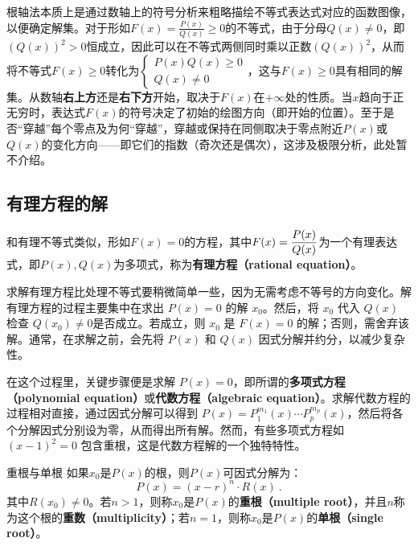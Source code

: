 根轴法本质上是通过数轴上的符号分析来粗略描绘不等式表达式对应的函数图像，以便确定解集。对于形如$\displaystyle F(x) = \frac{P(x)}{Q(x)} \geq 0$的不等式，由于分母$Q(x) \neq 0$，即$\left(Q(x)\right)^2 > 0$恒成立，因此可以在不等式两侧同时乘以正数$\left(Q(x)\right)^2$，从而将不等式$\displaystyle F(x) \geq 0$转化为$\displaystyle\begin{cases}P(x)Q(x) \geq 0 \\ Q(x) \neq 0\end{cases}$，这与$F(x) \geq 0$具有相同的解集。从数轴\textbf{右上方}还是\textbf{右下方}开始，取决于$F(x)$在$+\infty$处的性质。当$x$趋向于正无穷时，表达式$F(x)$的符号决定了初始的绘图方向（即开始的位置）。至于是否“穿越”每个零点及为何“穿越”，穿越或保持在同侧取决于零点附近$P(x)$或$Q(x)$的变化方向——即它们的指数（奇次还是偶次），这涉及极限分析，此处暂不介绍。

\subsection{有理方程的解}\label{sub_SolEqI_1}

和有理不等式类似，形如$F(x)=0$的方程，其中$\displaystyle F(x)={P(x)\over Q(x)}$为一个有理表达式，即$P(x),Q(x)$为多项式，称为\textbf{有理方程（rational equation）}。

求解有理方程比处理不等式要稍微简单一些，因为无需考虑不等号的方向变化。解有理方程的过程主要集中在求出 $P(x) = 0$ 的解 $x_0$。然后，将 $x_0$ 代入 $Q(x)$ 检查 $Q(x_0) \neq 0$是否成立。若成立，则 $x_0$ 是 $F(x) = 0$ 的解；否则，需舍弃该解。通常，在求解之前，会先将 $P(x)$ 和 $Q(x)$ 因式分解并约分，以减少复杂性。

在这个过程里，关键步骤便是求解 $P(x) = 0$，即所谓的\textbf{多项式方程（polynomial equation）}或\textbf{代数方程（algebraic equation）}。求解代数方程的过程相对直接，通过因式分解可以得到 $P(x) = P^{m_1}_1(x) \cdots P^{m_p}_p(x)$，然后将各个分解因式分别设为零，从而得出所有解。然而，有些多项式方程如 $(x - 1)^2 = 0$ 包含重根，这是代数方程解的一个独特特性。

\begin{definition}{重根与单根}
如果$x_0$是$P(x)$的根，则$P(x)$可因式分解为：
\begin{equation}
P(x) = (x - r)^n \cdot R(x)~.
\end{equation}
其中$R(x_0) \neq 0$。若$n>1$，则称$x_0$是$P(x)$的\textbf{重根（multiple root）}，并且$n$称为这个根的\textbf{重数（multiplicity）}；若$n=1$，则称$x_0$是$P(x)$的\textbf{单根（single root）}。
\end{definition}

